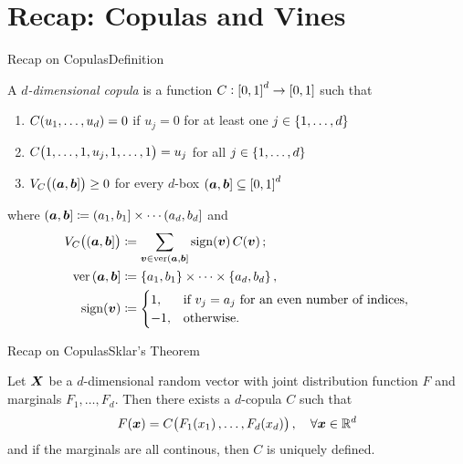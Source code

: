 \section{Recap: Copulas and Vines}
\label{sec:copula}

\begin{frame}{Recap on Copulas}{Definition}
  \begin{defn}[Copula]
    A \emph{\(d\)-dimensional copula} is a function \(C : \intcc{0,1}^{d} \to \intcc{0,1}\) such that
    \begin{enumerate}
    \item \(C\of{u_{1}, \dotsc, u_{d}} = 0\) if \(u_{j} = 0\) for at least one \(j \in \cbr{1,\dotsc,d}\)
    \item \(C\of{1, \dotsc, 1, u_{j}, 1, \dotsc, 1} = u_{j}\) for all \(j \in \cbr{1,\dotsc,d}\)
    \item \(V_{C}\of{\intoc{\va, \vb}} \geq 0\) for every \(d\)-box \(\intoc{\va,\vb} \subseteq \intcc{0,1}^{d}\)
    \end{enumerate}
    where \(\intoc{\va,\vb} \coloneqq \intoc{a_{1}, b_{1}} \times \dotsb \intoc{a_{d}, b_{d}}\) and
    \begin{align*}
      V_{C}\of{\intoc{\va,\vb}} &\coloneqq \sum_{\vv\in\ver\intoc{\va,\vb}}\sign\of{\vv} C\of{\vv} ; \\
      \ver\intoc{\va,\vb} &\coloneqq \cbr{a_{1}, b_{1}} \times \dotsb \times \cbr{a_{d}, b_{d}} , \\
      \sign\of{\vv} &\coloneqq
                      \begin{cases}
                        1, & \text{if}~ v_{j} = a_{j} ~\text{for an even number of indices}, \\
                        -1, & \text{otherwise} .
                      \end{cases}
    \end{align*}
  \end{defn}
\end{frame}

\begin{frame}{Recap on Copulas}{Sklar's Theorem}
  \begin{thm}
    Let \(\bm{X}\) be a \(d\)-dimensional random vector with joint distribution function \(F\) and marginals \(F_{1}, \dotsc, F_{d}\).
    Then there exists a \(d\)-copula \(C\) such that
    \begin{equation*}
      F\of{\vx} = C\of{F_{1}\of{x_{1}}, \dotsc, F_{d}\of{x_{d}}}, \quad \forall \vx \in \R^{d}
    \end{equation*}
    and if the marginals are all continous, then \(C\) is uniquely defined.
  \end{thm}
\end{frame}

